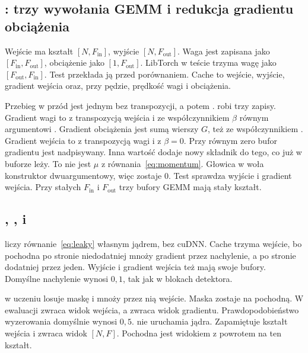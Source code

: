 \subsection{: trzy wywołania GEMM i redukcja gradientu obciążenia}

Wejście ma kształt \([N, F_{\mathrm{in}}]\), wyjście \([N, F_{\mathrm{out}}]\). Waga jest zapisana jako \([F_{\mathrm{in}}, F_{\mathrm{out}}]\), obciążenie jako \([1, F_{\mathrm{out}}]\). LibTorch w teście trzyma wagę jako \([F_{\mathrm{out}}, F_{\mathrm{in}}]\). Test przekłada ją przed porównaniem. Cache to wejście, wyjście, gradient wejścia oraz, przy pędzie, prędkość wagi i obciążenia.

Przebieg w przód jest jednym  bez transpozycji, a potem .  robi trzy zapisy. Gradient wagi to  z transpozycją wejścia i ze współczynnikiem \(\beta\) równym argumentowi . Gradient obciążenia jest sumą wierszy \(G\), też ze współczynnikiem . Gradient wejścia to  z transpozycją wagi i z \(\beta = 0\). Przy  równym zero bufor gradientu jest nadpisywany. Inna wartość dodaje nowy składnik do tego, co już w buforze leży. To nie jest \(\mu\) z równania~\eqref{eq:momentum}. Głowica w  woła konstruktor dwuargumentowy, więc  zostaje \(0\). Test  sprawdza wyjście i gradient wejścia. Przy stałych \(F_{\mathrm{in}}\) i \(F_{\mathrm{out}}\) trzy bufory GEMM mają stały kształt.

\subsection{, ,  i }

 liczy równanie~\eqref{eq:leaky} własnym jądrem, bez cuDNN. Cache trzyma wejście, bo pochodna po stronie niedodatniej mnoży gradient przez nachylenie, a po stronie dodatniej przez jeden. Wyjście i gradient wejścia też mają swoje bufory. Domyślne nachylenie wynosi \(0{,}1\), tak jak w blokach detektora.

 w uczeniu losuje maskę i mnoży przez nią wejście. Maska zostaje na pochodną. W ewaluacji  zwraca widok wejścia, a  zwraca widok gradientu. Prawdopodobieństwo wyzerowania domyślnie wynosi \(0{,}5\).  nie uruchamia jądra. Zapamiętuje kształt wejścia i zwraca widok \([N, F]\). Pochodna jest widokiem z powrotem na ten kształt.

